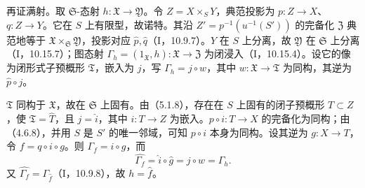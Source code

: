 再证满射。取 $\mathfrak S$-态射 $h:\mathfrak X\to\mathfrak Y$。令 $Z=X\times_SY$，典范投影为 $p:Z\to X$、$q:Z\to Y$。它在 $S$ 上有限型，故诺特。其沿 $Z'=p^{-1}(u^{-1}(S'))$ 的完备化 $\mathfrak Z$ 典范地等于 $\mathfrak X\times_{\mathfrak S}\mathfrak Y$，投影对应 $\widehat p,\widehat q$（I，10.9.7）。$Y$ 在 $S$ 上分离，故 $\mathfrak Y$ 在 $\mathfrak S$ 上分离（I，10.15.7）；图态射 $\Gamma_h=(1_{\mathfrak X},h):\mathfrak X\to\mathfrak Z$ 为闭浸入（I，10.15.4）。设它的像为闭形式子预概形 $\mathfrak T$，嵌入为 $j$，写 $\Gamma_h=j\circ w$，其中 $w:\mathfrak X\to\mathfrak T$ 为同构，其逆为 $\widehat p\circ j$。

$\mathfrak T$ 同构于 $\mathfrak X$，故在 $\mathfrak S$ 上固有。由（5.1.8），存在在 $S$ 上固有的闭子预概形 $T\subset Z$，使 $\mathfrak T=\widehat T$，且 $j=\widehat i$，其中 $i:T\to Z$ 为嵌入。$p\circ i:T\to X$ 的完备化为同构；由（4.6.8），并用 $S$ 是 $S'$ 的唯一邻域，可知 $p\circ i$ 本身为同构。设其逆为 $g:X\to T$，令 $f=q\circ i\circ g$。则 $\Gamma_f=i\circ g$，而
\[
\widehat{\Gamma_f}=\widehat i\circ\widehat g=j\circ w=\Gamma_h.
\]
又 $\widehat{\Gamma_f}=\Gamma_{\widehat f}$（I，10.9.8），故 $h=\widehat f$。\finishproof

